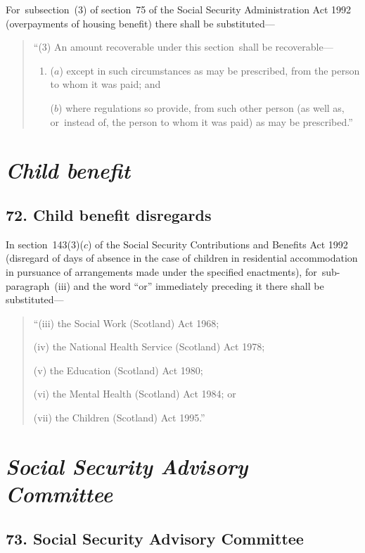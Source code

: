 \documentclass[12pt,a4paper]{article}
\begin{document}
For~subsection~(3)  of section~75 of the Social Security Administration Act 1992 (overpayments of housing benefit) there shall be substituted—
\begin{quotation}
“(3) An amount recoverable under this section~shall be recoverable—
\begin{enumerate}\item[]
($a$) except in such circumstances as may be prescribed, from the person to whom it was paid; and

($b$) where regulations so provide, from such other person (as well as, or~instead of, the person to whom it was paid) as may be prescribed.”
\end{enumerate}
\end{quotation}


\section{\itshape Child benefit}

\subsection{72. Child benefit disregards}

In section~143(3)($c$)  of the Social Security Contributions and Benefits Act 1992 (disregard of days of absence in the case of children in residential accommodation in pursuance of arrangements made under the specified enactments), for~sub-paragraph~(iii)  and the word “or” immediately preceding it there shall be substituted—
\begin{quotation}
“(iii) the Social Work (Scotland) Act 1968;

(iv) the National Health Service (Scotland) Act 1978;

(v) the Education (Scotland) Act 1980;

(vi) the Mental Health (Scotland) Act 1984; or

(vii) the Children (Scotland) Act 1995.”
\end{quotation}

\section{\itshape Social Security Advisory Committee}

\subsection{73. Social Security Advisory Committee}
\end{document}
